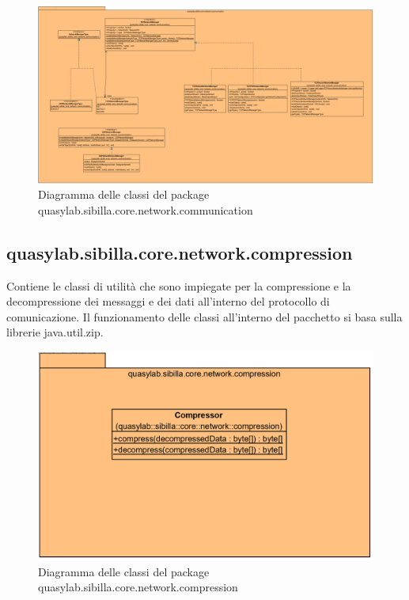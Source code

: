 \begin{figure}[H]
    \includegraphics[width=\linewidth]{images/quasylab.sibilla.core.network.communication.png}
    \captionsetup{justification=centering}
    \caption{Diagramma delle classi del package quasylab.sibilla.core.network.communication}
  \end{figure}

\subsection{quasylab.sibilla.core.network.compression} Contiene le classi di utilità che sono impiegate per la compressione e la decompressione dei messaggi e dei dati all’interno del protocollo di comunicazione. Il funzionamento delle classi all’interno del pacchetto si basa sulla librerie java.util.zip.

\begin{figure}[H]
    \includegraphics[width=\linewidth]{images/quasylab.sibilla.core.network.compression.png}
    \captionsetup{justification=centering}
    \caption{Diagramma delle classi del package quasylab.sibilla.core.network.compression}
  \end{figure}

